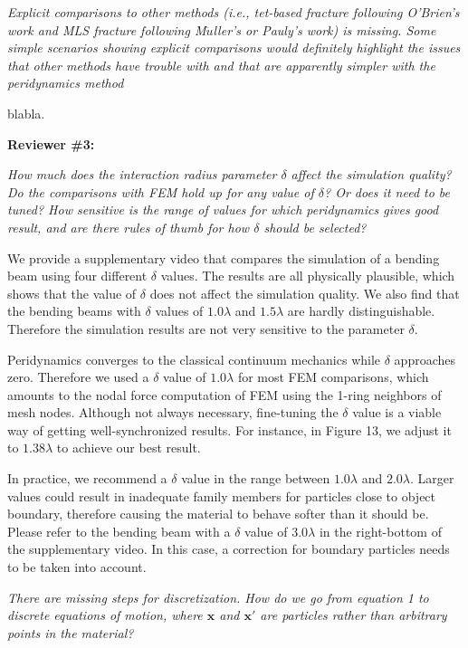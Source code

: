 \emph{Explicit comparisons to other methods (i.e., tet-based fracture following O'Brien's work and MLS fracture following M$\ddot{u}$ller's or Pauly's work) is missing. Some simple scenarios showing explicit comparisons would definitely highlight the issues that other methods have trouble with and that are apparently simpler with the peridynamics method}

blabla.

\noindent{}\textbf{Reviewer \#3:}

\emph{How much does the interaction radius parameter $\delta$ affect the simulation quality? Do the comparisons with FEM hold up for any value of $\delta$? Or does it need to be tuned? How sensitive is the range of values for which peridynamics gives good result, and are there rules of thumb for how $\delta$ should be selected?}

We provide a supplementary video that compares the simulation of a bending beam using four different $\delta$ values. The results are all physically plausible, which shows that the value of $\delta$ does not affect the simulation quality. We also find that the bending beams with $\delta$ values of $1.0\lambda$ and $1.5\lambda$ are hardly distinguishable. Therefore the simulation results are not very sensitive to the parameter $\delta$.

Peridynamics converges to the classical continuum mechanics while $\delta$ approaches zero\cite{Weckner2005705}. Therefore we used a $\delta$ value of $1.0\lambda$ for most FEM comparisons, which amounts to the nodal force computation of FEM using the 1-ring neighbors of mesh nodes. Although not always necessary, fine-tuning the $\delta$ value is a viable way of getting well-synchronized results. For instance, in Figure 13, we adjust it to $1.38\lambda$ to achieve our best result.

In practice, we recommend a $\delta$ value in the range between $1.0\lambda$ and $2.0\lambda$.
Larger values could result in inadequate family members for particles close to object boundary, therefore causing the material to behave softer than it should be. Please refer to the bending beam with a $\delta$ value of $3.0\lambda$ in the right-bottom of the supplementary video. In this case, a correction for boundary particles needs to be taken into account.

\emph{There are missing steps for discretization. How do we go from equation 1 to discrete equations of motion, where $\mathbf{x}$ and $\mathbf{x'}$ are particles rather than arbitrary points in the material? }


